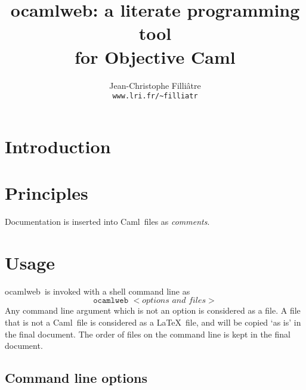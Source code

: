 \documentclass[12pt]{article}
\newcommand{\Caml}{\textsf{Caml}}
\newcommand{\ocamlweb}{\textsf{ocamlweb}}
\begin{document}
\title{ocamlweb: a literate programming tool \\ 
       for Objective Caml}
\author{Jean-Christophe Filli\^{a}tre \\
        \normalsize\texttt{www.lri.fr/\~{}filliatr}}
\date{}
\maketitle

\section{Introduction}


\section{Principles}

Documentation is inserted into \Caml\ files as \emph{comments}.



\section{Usage}

\ocamlweb\ is invoked with a shell command line as
\begin{displaymath}
  \texttt{ocamlweb }<\textit{options and files}>
\end{displaymath}
Any command line argument which is not an option is considered as a
file. A file that is not a \Caml\ file is considered as a \LaTeX\ file,
and will be copied `as is' in the final document. The order of files
on the command line is kept in the final document. 

\subsection*{Command line options}
\end{document}
